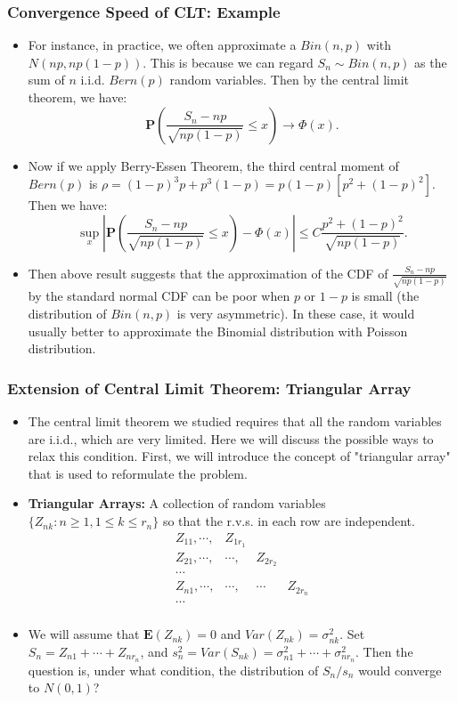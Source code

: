 \documentclass[handout]{beamer}
\newcommand{\BP}{\mathbf{P}}
\newcommand{\BE}{\mathbf{E}}
\begin{document}
 
      \frame
{
  \frametitle{Convergence Speed of CLT: Example}

 \begin{itemize}
 \item<1-> For instance, in practice, we often approximate a $Bin(n,p)$ with $N(np, np(1-p))$. This is because we can regard $S_n\sim Bin(n,p)$ as the sum of $n$ i.i.d. $Bern(p)$ random variables. Then by the central limit theorem, we have: 
 $$\BP(\frac{S_n-np}{\sqrt{np(1-p)}}\leq x)\rightarrow \Phi(x).$$
 
 \item<2-> Now if we apply Berry-Essen Theorem, the third central moment of $Bern(p)$ is $\rho=(1-p)^3p+p^3 (1-p)=p(1-p)[p^2+(1-p)^2]$. Then we have:
 $$\sup_x| \BP(\frac{S_n-np}{\sqrt{np(1-p)}} \leq x)-\Phi(x)| \leq C \frac{p^2+(1-p)^2}{\sqrt{np(1-p)}}.$$

 \item<3->[-] Then above result suggests that the approximation of the CDF of $\frac{S_n-np}{\sqrt{np(1-p)}}$ by the standard normal CDF can be poor when $p$ or $1-p$ is small (the distribution of $Bin(n,p)$ is very asymmetric). In these case, it would usually better to approximate the Binomial distribution with Poisson distribution.  
 
\end{itemize}
 }
 
  
   
  
     \frame
{
  \frametitle{Extension of Central Limit Theorem: Triangular Array}
   \begin{itemize}

\item<1-> The central limit theorem we studied requires that all the random variables are i.i.d., which are very limited. Here we will discuss the possible ways to relax this condition. First, we will introduce the concept of "triangular array" that is used to reformulate the problem. 

\item<2->\textbf{Triangular Arrays:} A collection of random variables $\{Z_{nk}: n\geq 1, 1\leq k \leq r_n\}$ so that the r.v.s. in each row are independent. 
$$\begin{array}{llll}
Z_{11},\cdots, & Z_{1r_1} & \\
Z_{21},\cdots,  & \cdots, &  Z_{2 r_2} \\
\cdots \\
Z_{n1},\cdots,  & \cdots, & \cdots  &  Z_{2 r_n} \\
\cdots \\
\end{array}$$
\item<3-> We will assume that $\BE(Z_{nk})=0$ and $Var(Z_{nk}) =\sigma_{nk}^2$. Set $S_n=Z_{n1}+\cdots+Z_{nr_n}$, and $s_n^2=Var(S_{nk})=\sigma^2_{n1}+\cdots+\sigma^2_{nr_n}$. Then the question is, under what condition, the distribution of $S_n/s_n$ would converge to $N(0,1)$? 

\end{itemize}
 }
 
\end{document}
